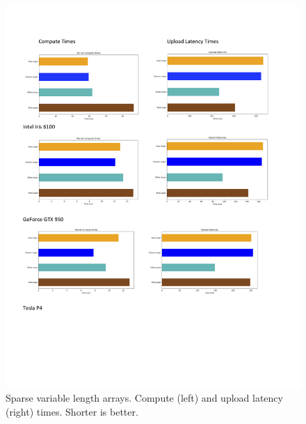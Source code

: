 \documentclass[conference]{IEEEtran}
\begin{document}
\begin{figure}
\centering
\includegraphics[scale=0.45]{var_sparse.jpg}
\caption{Sparse variable length arrays. Compute (left) and upload latency (right) times. Shorter is better.}
\end{figure}

\clearpage
\newpage
\end{document}
